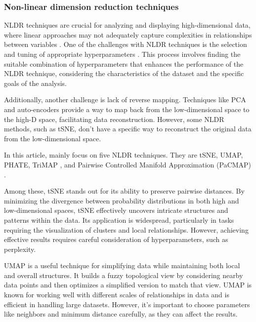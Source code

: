 \documentclass[
  12pt]{article}
\begin{document}
\hypertarget{non-linear-dimension-reduction-techniques}{%
\subsubsection{Non-linear dimension reduction
techniques}\label{non-linear-dimension-reduction-techniques}}

NLDR techniques are crucial for analyzing and displaying
high-dimensional data, where linear approaches may not adequately
capture complexities in relationships between variables
\citep{Johnstone2009}. One of the challenges with NLDR techniques is the
selection and tuning of appropriate hyperparameters \citep{liao2023}.
This process involves finding the suitable combination of
hyperparameters that enhances the performance of the NLDR technique,
considering the characteristics of the dataset and the specific goals of
the analysis.

Additionally, another challenge is lack of reverse mapping. Techniques
like PCA and auto-encoders \citep{article65} provide a way to map back
from the low-dimensional space to the high-D space, facilitating data
reconstruction. However, some NLDR methods, such as tSNE, don't have a
specific way to reconstruct the original data from the low-dimensional
space.

In this article, mainly focus on five NLDR techniques. They are tSNE,
UMAP, PHATE, TriMAP \citep{article02}, and Pairwise Controlled Manifold
Approximation (PaCMAP) \citep{article01}.

Among these, tSNE \citep{Laurens2008} stands out for its ability to
preserve pairwise distances. By minimizing the divergence between
probability distributions in both high and low-dimensional spaces, tSNE
effectively uncovers intricate structures and patterns within the data.
Its application is widespread, particularly in tasks requiring the
visualization of clusters and local relationships. However, achieving
effective results requires careful consideration of hyperparameters,
such as perplexity.

UMAP \citep{Leland2018} is a useful technique for simplifying data while
maintaining both local and overall structures. It builds a fuzzy
topological view by considering nearby data points and then optimizes a
simplified version to match that view. UMAP is known for working well
with different scales of relationships in data and is efficient in
handling large datasets. However, it's important to choose parameters
like neighbors and minimum distance carefully, as they can affect the
results.
\end{document}
